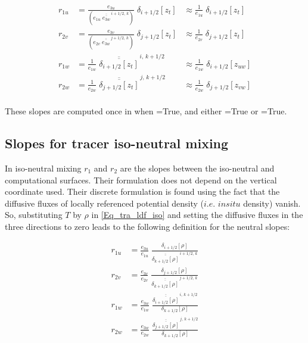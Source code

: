 \documentclass[NEMO_book]{subfiles}
\begin{document}
\begin{equation} \label{Eq_ldfslp_geo}
\begin{aligned}
 r_{1u} &= \frac{e_{3u}}{ \left( e_{1u}\;\overline{\overline{e_{3w}}}^{\,i+1/2,\,k} \right)}
 			  \;\delta_{i+1/2}[z_t] 
 		&\approx \frac{1}{e_{1u}}\; \delta_{i+1/2}[z_t] 
\\
 r_{2v} &= \frac{e_{3v}}{\left( e_{2v}\;\overline{\overline{e_{3w}}}^{\,j+1/2,\,k} \right)} 
 			  \;\delta_{j+1/2} [z_t] 
		&\approx \frac{1}{e_{2v}}\; \delta_{j+1/2}[z_t] 
\\
 r_{1w} &= \frac{1}{e_{1w}}\;\overline{\overline{\delta_{i+1/2}[z_t]}}^{\,i,\,k+1/2}
 		&\approx \frac{1}{e_{1w}}\; \delta_{i+1/2}[z_{uw}] 
 \\
 r_{2w} &= \frac{1}{e_{2w}}\;\overline{\overline{\delta_{j+1/2}[z_t]}}^{\,j,\,k+1/2}
		&\approx \frac{1}{e_{2w}}\; \delta_{j+1/2}[z_{vw}] 
 \\
\end{aligned}
\end{equation}


These slopes are computed once in  when =True, 
and either =True or =True. 

\subsection{Slopes for tracer iso-neutral mixing}\label{LDF_slp_iso}
In iso-neutral mixing  $r_1$ and $r_2$ are the slopes between the iso-neutral 
and computational surfaces. Their formulation does not depend on the vertical 
coordinate used. Their discrete formulation is found using the fact that the 
diffusive fluxes of locally referenced potential density ($i.e.$ $in situ$ density) 
vanish. So, substituting $T$ by $\rho$ in \eqref{Eq_tra_ldf_iso} and setting the 
diffusive fluxes in the three directions to zero leads to the following definition for 
the neutral slopes:

\begin{equation} \label{Eq_ldfslp_iso}
\begin{split}
 r_{1u} &= \frac{e_{3u}}{e_{1u}}\; \frac{\delta_{i+1/2}[\rho]}
 								{\overline{\overline{\delta_{k+1/2}[\rho]}}^{\,i+1/2,\,k}}
\\
 r_{2v} &= \frac{e_{3v}}{e_{2v}}\; \frac{\delta_{j+1/2}\left[\rho \right]}
 								{\overline{\overline{\delta_{k+1/2}[\rho]}}^{\,j+1/2,\,k}}
\\
 r_{1w} &= \frac{e_{3w}}{e_{1w}}\; 
 			\frac{\overline{\overline{\delta_{i+1/2}[\rho]}}^{\,i,\,k+1/2}}
				 {\delta_{k+1/2}[\rho]}
\\
 r_{2w} &= \frac{e_{3w}}{e_{2w}}\; 
 			\frac{\overline{\overline{\delta_{j+1/2}[\rho]}}^{\,j,\,k+1/2}}
				 {\delta_{k+1/2}[\rho]}
\\
\end{split}
\end{equation}
\end{document}
